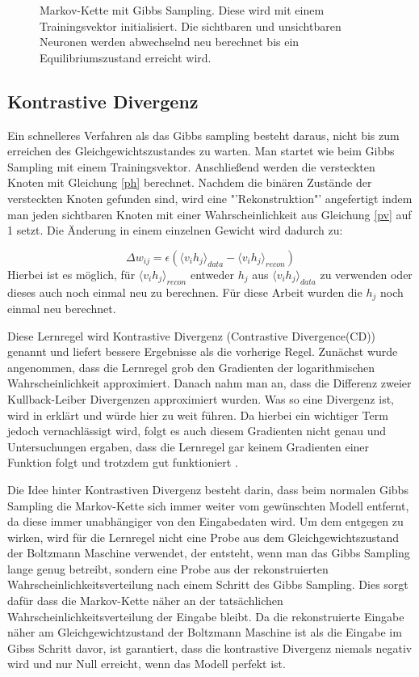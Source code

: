 \documentclass[12pt]{article}
\begin{document}
\begin{figure}[H]
	\center
	
	\caption{Markov-Kette mit Gibbs Sampling. Diese wird mit einem Trainingsvektor initialisiert. Die sichtbaren und unsichtbaren Neuronen werden abwechselnd neu berechnet bis ein Equilibriumszustand erreicht wird.}
	\label{Markov}
	\end{figure}


\subsection{Kontrastive Divergenz}

Ein schnelleres Verfahren als das Gibbs sampling besteht daraus, nicht bis zum erreichen des Gleichgewichtszustandes zu warten. Man startet wie beim Gibbs Sampling mit einem Trainingsvektor. Anschließend werden die versteckten Knoten mit Gleichung \ref{ph} berechnet. Nachdem die binären Zustände der versteckten Knoten gefunden sind, wird eine "'Rekonstruktion"' angefertigt indem man jeden sichtbaren Knoten mit einer Wahrscheinlichkeit aus Gleichung \ref{pv} auf 1 setzt. Die Änderung in einem einzelnen Gewicht wird dadurch zu:

\begin{equation}
\Delta w_{ij} = \epsilon \left( \langle v_i h_j\rangle_{data} - \langle v_i h_j \rangle_{recon}\right)
\end{equation}
Hierbei ist es möglich, für $\langle v_i h_j \rangle_{recon}$ entweder $h_j$ aus $\langle v_i h_j\rangle_{data}$ zu verwenden oder dieses auch noch einmal neu zu berechnen. Für diese Arbeit wurden die $h_j$ noch einmal neu berechnet.


Diese Lernregel wird Kontrastive Divergenz (Contrastive Divergence(CD)) genannt und liefert bessere Ergebnisse als die vorherige Regel. Zunächst wurde angenommen, dass die  Lernregel grob den Gradienten der logarithmischen Wahrscheinlichkeit approximiert. Danach nahm man an, dass die Differenz zweier Kullback-Leiber Divergenzen approximiert wurden. Was so eine Divergenz ist, wird in \cite{KLD} erklärt und würde hier zu weit führen. Da hierbei ein wichtiger Term jedoch vernachlässigt wird, folgt es auch diesem Gradienten nicht genau und Untersuchungen ergaben, dass die Lernregel gar keinem Gradienten einer Funktion folgt und trotzdem gut funktioniert \cite{noconv}. 

Die Idee hinter Kontrastiven Divergenz besteht darin, dass beim normalen Gibbs Sampling die Markov-Kette sich immer weiter vom gewünschten Modell entfernt, da diese immer unabhängiger von den Eingabedaten wird. Um dem entgegen zu wirken, wird für die Lernregel nicht eine Probe aus dem Gleichgewichtszustand der Boltzmann Maschine verwendet, der entsteht, wenn man das Gibbs Sampling lange genug betreibt, sondern eine Probe aus der rekonstruierten Wahrscheinlichkeitsverteilung nach einem Schritt des Gibbs Sampling. Dies sorgt dafür dass die Markov-Kette näher an der tatsächlichen Wahrscheinlichkeitsverteilung der Eingabe bleibt. Da die rekonstruierte Eingabe näher am Gleichgewichtzustand der Boltzmann Maschine ist als die Eingabe im Gibss Schritt davor, ist garantiert, dass die kontrastive Divergenz niemals negativ wird und nur Null erreicht, wenn das Modell perfekt ist. \cite{digits}
\end{document}
